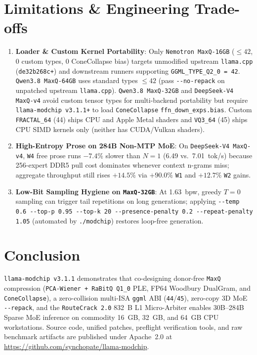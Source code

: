 \documentclass[10pt,twocolumn]{article}
\begin{document}
\section{Limitations \& Engineering Trade-offs}
\begin{enumerate}
    \item \textbf{Loader \& Custom Kernel Portability}: Only \texttt{Nemotron MaxQ-16GB} ($\le 42$, 0 custom types, 0 ConeCollapse bias) targets unmodified upstream \texttt{llama.cpp} (\texttt{de32b268c+}) and downstream runners supporting \texttt{GGML\_TYPE\_Q2\_0 = 42}. \texttt{Qwen3.8 MaxQ-64GB} uses standard types $\le 42$ (pass \texttt{{-}{-}no-repack} on unpatched upstream \texttt{llama.cpp}). \texttt{Qwen3.8 MaxQ-32GB} and \texttt{DeepSeek-V4 MaxQ-v4} avoid custom tensor types for multi-backend portability but require \texttt{llama-modchip v3.1.1+} to load \texttt{ConeCollapse} \texttt{ffn\_down\_exps.bias}. Custom \texttt{FRACTAL\_64} (44) ships CPU and Apple Metal shaders and \texttt{VQ3\_64} (45) ships CPU SIMD kernels only (neither has CUDA/Vulkan shaders).
    \item \textbf{High-Entropy Prose on 284B Non-MTP MoE}: On \texttt{DeepSeek-V4 MaxQ-v4}, \texttt{W4} free prose runs $-7.4\%$ slower than $N=1$ (6.49 vs.\ 7.01~tok/s) because 256-expert DDR5 pull cost dominates whenever context n-grams miss; aggregate throughput still rises $+14.5\%$ via $+90.0\%$ \texttt{W1} and $+12.7\%$ \texttt{W2} gains.
    \item \textbf{Low-Bit Sampling Hygiene on \texttt{MaxQ-32GB}}: At 1.63~bpw, greedy $T=0$ sampling can trigger tail repetitions on long generations; applying \texttt{{-}{-}temp 0.6 {-}{-}top-p 0.95 {-}{-}top-k 20 {-}{-}presence-penalty 0.2 {-}{-}repeat-penalty 1.05} (automated by \texttt{./modchip}) restores loop-free generation.
\end{enumerate}

\section{Conclusion}
\texttt{llama-modchip v3.1.1} demonstrates that co-designing donor-free \texttt{MaxQ} compression (\texttt{PCA-Wiener + RaBitQ Q1\_0} PLE, FP64 Woodbury DualGram, and \texttt{ConeCollapse}), a zero-collision multi-ISA \texttt{ggml} ABI (\texttt{44}/\texttt{45}), zero-copy 3D MoE \texttt{{-}{-}repack}, and the \texttt{RouteCrack 2.0} 832~B L1 Micro-Arbiter enables 30B--284B Sparse MoE inference on commodity 16~GB, 32~GB, and 64~GB CPU workstations. Source code, unified patches, preflight verification tools, and raw benchmark artifacts are published under Apache~2.0 at \url{https://github.com/synchopate/llama-modchip}.
\end{document}
